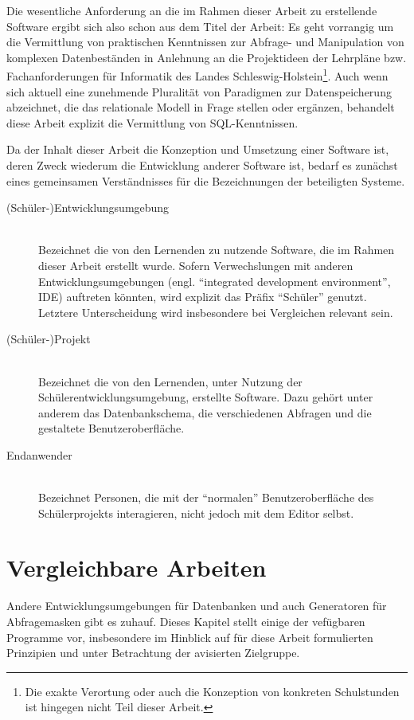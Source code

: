 \documentclass[paper=a4,fontsize=11pt,parskip=half]{scrartcl}
\begin{document}
Die wesentliche Anforderung an die im Rahmen dieser Arbeit zu erstellende Software ergibt sich also schon aus dem Titel der Arbeit: Es geht vorrangig um die Vermittlung von praktischen Kenntnissen zur Abfrage- und Manipulation von komplexen Datenbeständen in Anlehnung an die Projektideen der Lehrpläne \cite{lehrplan-inf-sek-1} bzw. Fachanforderungen \cite{lehrplan-inf-sek-2} für Informatik des Landes Schleswig-Holstein\footnote{Die exakte Verortung oder auch die Konzeption von konkreten Schulstunden ist hingegen nicht Teil dieser Arbeit.}. Auch wenn sich aktuell eine zunehmende Pluralität von Paradigmen zur Datenspeicherung abzeichnet, die das relationale Modell in Frage stellen oder ergänzen, behandelt diese Arbeit explizit die Vermittlung von SQL-Kenntnissen. 

Da der Inhalt dieser Arbeit die Konzeption und Umsetzung einer Software ist, deren Zweck wiederum die Entwicklung anderer Software ist, bedarf es zunächst eines gemeinsamen Verständnisses für die Bezeichnungen der beteiligten Systeme.

\begin{description}
\item[(Schüler-)Entwicklungsumgebung] \hfill\\ 
  Bezeichnet die von den Lernenden zu nutzende Software, die im Rahmen dieser Arbeit erstellt wurde. Sofern Verwechslungen mit anderen Entwicklungsumgebungen (engl. ``integrated development environment'', IDE) auftreten könnten, wird explizit das Präfix ``Schüler'' genutzt. Letztere Unterscheidung wird insbesondere bei Vergleichen relevant sein.
\item[(Schüler-)Projekt] \hfill\\
  Bezeichnet die von den Lernenden, unter Nutzung der Schülerentwicklungsumgebung, erstellte Software. Dazu gehört unter anderem das Datenbankschema, die verschiedenen Abfragen und die gestaltete Benutzeroberfläche.
\item[Endanwender] \hfill\\
  Bezeichnet Personen, die mit der ``normalen'' Benutzeroberfläche des Schülerprojekts interagieren, nicht jedoch mit dem Editor selbst.
\end{description}

\section{Vergleichbare Arbeiten}

Andere Entwicklungsumgebungen für Datenbanken und auch Generatoren für Abfragemasken gibt es zuhauf. Dieses Kapitel stellt einige der vefügbaren Programme vor, insbesondere im Hinblick auf für diese Arbeit formulierten Prinzipien und unter Betrachtung der avisierten Zielgruppe.
\end{document}
